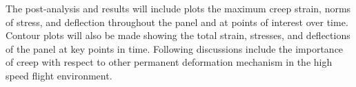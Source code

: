 \documentclass[conf]{new-aiaa}
\begin{document}
\noindent
The post-analysis and results will include plots the maximum creep strain, norms of stress, 
and deflection throughout the panel and at points of interest over time. 
Contour plots will also be made showing the total strain, stresses, and deflections
of the panel at key points in time.
Following discussions include the importance of creep 
with respect to other permanent deformation mechanism 
in the high speed flight environment.



% 


\end{document}
